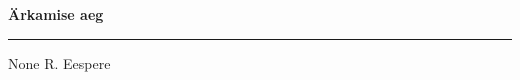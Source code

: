 \documentclass[10pt]{book}
\begin{document}
{
  \samepage
  \raggedbottom
  \raggedright
  \sloppy


  \vspace{0.2in}

  \noindent\begin{minipage}{.1\textwidth}
    \hfill\vspace{0.1in}
  \end{minipage}%
  \noindent\begin{minipage}{.8\textwidth}
    \centering
    \bfseries
    \large \"Arkamise aeg
  \end{minipage}%
  \noindent\begin{minipage}{.1\textwidth}
      \hfill\vspace{0.1in}
  \end{minipage}

  \nopagebreak[4]
  \vspace{0.1in}
  \nopagebreak[4]
  \hrule height 0.05ex
  \nopagebreak[4]
  \vspace{-0.05in}

  {\footnotesize None \hfill R. Eespere }\\
  \vspace{0.01in}



}
\end{document}
